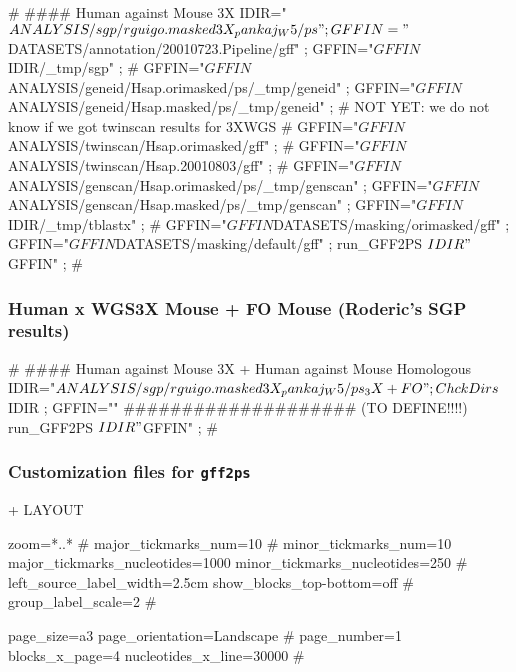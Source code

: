 \documentclass[11pt]{article}
\def\nwendcode{\endtrivlist \endgroup} %
\let\nwdocspar=\par                    %
\newcommand{\subsubsctn}[1]{\subsubsection{#1}}
\def\gps{\texttt{gff2ps}}
\begin{document}
\nwenddocs{}\plusendmoddef
#
#### Human against Mouse 3X 
IDIR="$ANALYSIS/sgp/rguigo.masked3X_pankaj_W5/ps" ;
GFFIN="$DATASETS/annotation/20010723.Pipeline/gff" ;
GFFIN="$GFFIN $IDIR/_tmp/sgp" ;
# GFFIN="$GFFIN $ANALYSIS/geneid/Hsap.orimasked/ps/_tmp/geneid" ;
GFFIN="$GFFIN $ANALYSIS/geneid/Hsap.masked/ps/_tmp/geneid" ;
# NOT YET: we do not know if we got twinscan results for 3XWGS
#     GFFIN="$GFFIN $ANALYSIS/twinscan/Hsap.orimasked/gff" ;
#     GFFIN="$GFFIN $ANALYSIS/twinscan/Hsap.20010803/gff" ;
# GFFIN="$GFFIN $ANALYSIS/genscan/Hsap.orimasked/ps/_tmp/genscan" ;
GFFIN="$GFFIN $ANALYSIS/genscan/Hsap.masked/ps/_tmp/genscan" ;
GFFIN="$GFFIN $IDIR/_tmp/tblastx" ;
# GFFIN="$GFFIN $DATASETS/masking/orimasked/gff" ;
GFFIN="$GFFIN $DATASETS/masking/default/gff" ;
run_GFF2PS $IDIR "$GFFIN" ;
#
\nwendcode{}\nwdocspar

\subsubsctn{Human x WGS3X Mouse + FO Mouse (Roderic's SGP results)} %

\nwenddocs{}\plusendmoddef
#
#### Human against Mouse 3X + Human against Mouse Homologous 
IDIR="$ANALYSIS/sgp/rguigo.masked3X_pankaj_W5/ps_3X+FO" ;
ChckDirs $IDIR ;
GFFIN="" #################### (TO DEFINE!!!!)
run_GFF2PS $IDIR "$GFFIN" ;
#
\nwendcode{}\nwdocspar

\subsubsctn{Customization files for {\gps}}

+ LAYOUT

\nwenddocs{}\endmoddef
zoom=*..*
# major_tickmarks_num=10
# minor_tickmarks_num=10
major_tickmarks_nucleotides=1000
minor_tickmarks_nucleotides=250
#
left_source_label_width=2.5cm
show_blocks_top-bottom=off
#
group_label_scale=2
#
\nwendcode{}\nwdocspar

\nwenddocs{}\endmoddef
page_size=a3
page_orientation=Landscape
# page_number=1
blocks_x_page=4
nucleotides_x_line=30000
#
\nwendcode{}\nwdocspar
\end{document}
